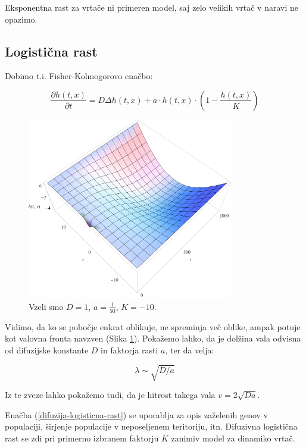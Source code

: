 \documentclass[a4paper, twoside, 12pt]{book}
\begin{document}
    Eksponentna rast za vrtače ni primeren model, saj zelo velikih vrtač v naravi ne opazimo.

    \subsection{Logistična rast}

    Dobimo t.i. Fisher-Kolmogorovo enačbo:

    \begin{equation}
      \frac{ \partial h(t,x) }{ \partial t} = D \Delta h(t,x) + a \cdot h(t,x) \cdot (1 - \frac{h(t,x)}{K})
      \label{difuzija-logisticna-rast}
    \end{equation}
    \begin{figure}[h!]
      \begin{center}
        \includegraphics[width=9cm]{slike/difuzija-logisticna-rast2}
      \end{center}
      \caption{Vzeli smo $D=1$, $a=\frac{1}{50}$, $K=-10$.}
      \label{fig:difuzija-logisticna-rast}
    \end{figure}

    Vidimo, da ko se pobočje enkrat oblikuje, ne spreminja več oblike, ampak potuje kot valovna fronta navzven (Slika \ref{fig:difuzija-logisticna-rast}). Pokažemo lahko, da je dolžina vala odvisna od difuzijske konstante $D$ in faktorja rasti $a$, ter da velja: 

    \[ \lambda \sim \sqrt{D/a} \]

    Iz te zveze lahko pokažemo tudi, da je hitrost takega vala $v = 2 \sqrt{D a}$.

    Enačba (\ref{difuzija-logisticna-rast}) se uporablja za opis zaželenih genov v populaciji, širjenje populacije v neposeljenem teritoriju, itn.
    Difuzivna logistična rast se zdi pri primerno izbranem faktorju $K$ zanimiv model za dinamiko vrtač.
\end{document}
